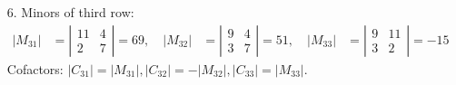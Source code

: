 \documentclass{./../../Latex/homework}
\begin{document}
\begin{enumerate}
\item[6.] Minors of third row:
\[
\begin{aligned}
\left|M_{31}\right| &=\left|\begin{array}{cc}
11 & 4 \\
2 & 7
\end{array}\right| = 69, \quad
\left|M_{32}\right|&=\left|\begin{array}{cc}
9 & 4 \\
3 & 7
\end{array}\right| = 51, \quad
 \left|M_{33}\right|&=\left|\begin{array}{ll}
9 & 11 \\
3 & 2
\end{array}\right| =-15
\end{aligned}
\]
Cofactors: $ |C_{31}| =  |M_{31}|, |C_{32}| =  -|M_{32}| , |C_{33}| =  |M_{33}| $.\end{enumerate}
\end{document}
